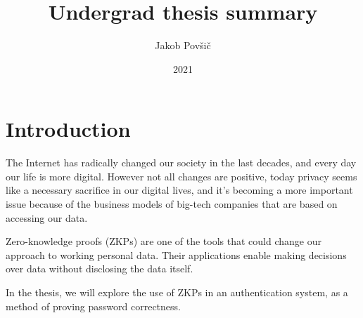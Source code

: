 \documentclass[12pt]{article}
\title{Undergrad thesis summary}
\author{Jakob Povšič}
\date{2021}
\begin{document}
	\maketitle
	
%	 
%	

	\section{Introduction}
	The Internet has radically changed our society in the last decades, and every day our life is more digital.
	However not all changes are positive, today privacy seems like a necessary sacrifice in our digital lives, and it’s becoming a more important issue because of the business models of big-tech companies that are based on accessing our data.

	
	Zero-knowledge proofs (ZKPs) are one of the tools that could change our approach to working personal data.
	Their applications enable making decisions over data without disclosing the data itself.
	
	In the thesis, we will explore the use of ZKPs in an authentication system, as a method of proving password correctness.
	
	\newpage
	
\end{document}
